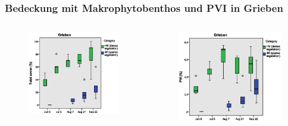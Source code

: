 \documentclass{beamer}
\begin{document}
\begin{frame}
\frametitle{Bedeckung mit Makrophytobenthos und PVI in Grieben}
\begin{columns}
\begin{column}{5.5cm}
\begin{figure}
\includegraphics[width=\textwidth]{images/total_cover/total_cover2.eps}
\end{figure}
\end{column}
\begin{column}{5.5cm}
\begin{figure}
\includegraphics[width=\textwidth]{images/pvi/boxplot_pvi2.eps}
\end{figure}
\end{column}
\end{columns}
\end{frame}
\end{document}
